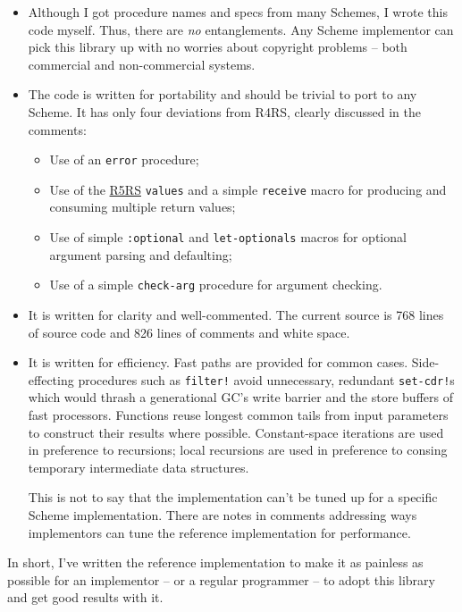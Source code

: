 \begin{itemize}
\tightlist
\item
  Although I got procedure names and specs from many Schemes, I wrote
  this code myself. Thus, there are \emph{no} entanglements. Any Scheme
  implementor can pick this library up with no worries about copyright
  problems -- both commercial and non-commercial systems.
\item
  The code is written for portability and should be trivial to port to
  any Scheme. It has only four deviations from R4RS, clearly discussed
  in the comments:

  \begin{itemize}
  \tightlist
  \item
    Use of an \texttt{error} procedure;
  \item
    Use of the \protect\hyperlink{R5RS}{R5RS} \texttt{values} and a
    simple \texttt{receive} macro for producing and consuming multiple
    return values;
  \item
    Use of simple \texttt{:optional} and \texttt{let-optionals} macros
    for optional argument parsing and defaulting;
  \item
    Use of a simple \texttt{check-arg} procedure for argument checking.
  \end{itemize}
\item
  It is written for clarity and well-commented. The current source is
  768 lines of source code and 826 lines of comments and white space.
\item
  It is written for efficiency. Fast paths are provided for common
  cases. Side-effecting procedures such as \texttt{filter!} avoid
  unnecessary, redundant \texttt{set-cdr!}s which would thrash a
  generational GC's write barrier and the store buffers of fast
  processors. Functions reuse longest common tails from input parameters
  to construct their results where possible. Constant-space iterations
  are used in preference to recursions; local recursions are used in
  preference to consing temporary intermediate data structures.

  This is not to say that the implementation can't be tuned up for a
  specific Scheme implementation. There are notes in comments addressing
  ways implementors can tune the reference implementation for
  performance.
\end{itemize}

In short, I've written the reference implementation to make it as
painless as possible for an implementor -- or a regular programmer -- to
adopt this library and get good results with it.

